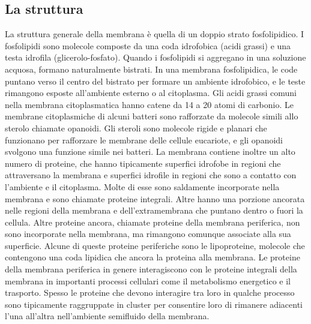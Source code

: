 \subsection{La struttura}
La struttura generale della membrana è quella di un doppio strato fosfolipidico. I fosfolipidi sono molecole composte da una coda idrofobica (acidi grassi) e una testa idrofila
(glicerolo-fosfato).
Quando i fosfolipidi si aggregano in una soluzione acquosa, formano naturalmente bistrati. In una membrana
fosfolipidica, le code puntano verso il centro del bistrato per formare un ambiente idrofobico, e le teste rimangono esposte
all'ambiente esterno o al citoplasma. Gli acidi grassi comuni nella membrana citoplasmatica hanno catene da  14 a 20 atomi di carbonio.
Le membrane citoplasmiche di alcuni batteri sono rafforzate da molecole simili allo sterolo chiamate opanoidi. Gli steroli sono molecole rigide e planari
che funzionano per rafforzare le membrane delle cellule eucariote, e gli opanoidi svolgono una funzione simile nei batteri.
La membrana contiene inoltre un alto numero di proteine, che hanno tipicamente superfici idrofobe in regioni che attraversano la membrana e superfici
idrofile in regioni che sono a contatto con l'ambiente e il citoplasma. Molte di esse sono saldamente incorporate nella membrana e sono chiamate proteine
integrali. Altre hanno una porzione ancorata nelle regioni della membrana e dell'extramembrana che puntano dentro o fuori la cellula. Altre proteine ancora,
chiamate proteine della membrana periferica, non sono incorporate nella membrana, ma rimangono comunque associate alla sua superficie. Alcune di queste
proteine periferiche sono le lipoproteine, molecole che contengono una coda lipidica che ancora la proteina alla membrana. Le proteine della membrana
periferica in genere interagiscono con le proteine integrali della membrana in importanti processi cellulari come il metabolismo energetico e il trasporto.
Spesso le proteine che devono interagire tra loro in qualche processo sono tipicamente raggruppate in cluster per consentire loro di rimanere adiacenti
l'una all'altra nell'ambiente semifluido della  membrana.
